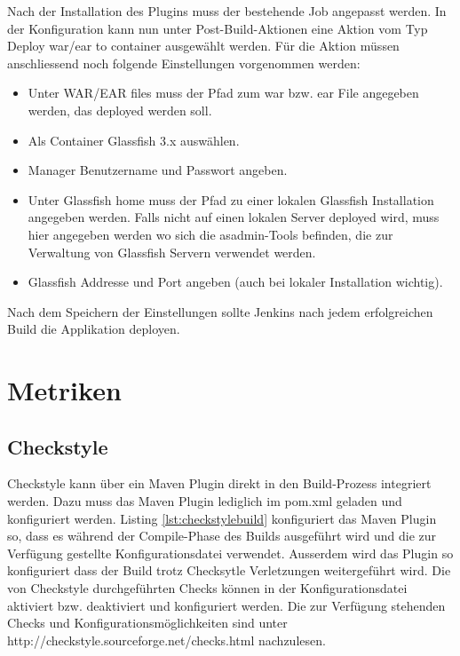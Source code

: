 Nach der Installation des Plugins muss der bestehende Job angepasst werden. In der Konfiguration kann nun unter Post-Build-Aktionen eine Aktion vom Typ Deploy war/ear to container ausgewählt werden. Für die Aktion müssen anschliessend noch folgende Einstellungen vorgenommen werden:
\begin{itemize}
	\item Unter WAR/EAR files muss der Pfad zum war bzw. ear File angegeben werden, das deployed werden soll.
	\item Als Container Glassfish 3.x auswählen.
	\item Manager Benutzername und Passwort angeben.
	\item Unter Glassfish home muss der Pfad zu einer lokalen Glassfish Installation angegeben werden. Falls nicht auf einen lokalen Server deployed wird, muss hier angegeben werden wo sich die asadmin-Tools befinden, die zur Verwaltung von Glassfish Servern verwendet werden.
	\item Glassfish Addresse und Port angeben (auch bei lokaler Installation wichtig).
\end{itemize}

Nach dem Speichern der Einstellungen sollte Jenkins nach jedem erfolgreichen Build die Applikation deployen.


\section{Metriken}


\subsection{Checkstyle}

Checkstyle kann über ein Maven Plugin direkt in den Build-Prozess integriert werden. Dazu muss das Maven Plugin lediglich im pom.xml geladen und konfiguriert werden. Listing \ref{lst:checkstylebuild} konfiguriert das Maven Plugin so, dass es während der Compile-Phase des Builds ausgeführt wird und die zur Verfügung gestellte Konfigurationsdatei verwendet. Ausserdem wird das Plugin so konfiguriert dass der Build trotz Checksytle Verletzungen weitergeführt wird. Die von Checkstyle durchgeführten Checks können in der Konfigurationsdatei aktiviert bzw. deaktiviert und konfiguriert werden. Die zur Verfügung stehenden Checks und Konfigurationsmöglichkeiten sind unter http://checkstyle.sourceforge.net/checks.html nachzulesen.

